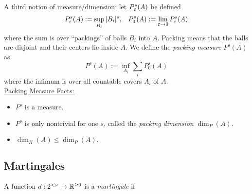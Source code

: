 \documentclass{amsart}
\begin{document}
	A third notion of measure/dimension: let $P^s_{\varepsilon}(A)$ be defined
	$$
	P^s_{\varepsilon}(A) := \sup_{B_i} |B_i|^s, \;\;\; P_0^s(A) := \lim_{\varepsilon\to 0} P_{\varepsilon}^s(A)
	$$
	where the sum is over ``packings'' of balls $B_i$ into $A$. Packing means that the balls are disjoint and their centers lie inside $A$. We define the \textit{packing measure} $P^s(A)$ as
	$$
	P^s(A) := \inf_{A_i} \sum_iP^s_0(A)
	$$
	where the infimum is over all countable covers $A_i$ of $A$.\\
	
	\underline{Packing Measure Facts:}
	\begin{itemize}
		\item $P^s$ is a measure.
		\item $P^s$ is only nontrivial for one $s$, called the \textit{packing dimension} $\dim_P(A)$.
		\item $\dim_H(A)\leq \dim_P(A)$.\\
	\end{itemize}
	
	\subsection{Martingales} A function $d:2^{<\omega}\to \mathbb{R}^{\geq 0}$ is a \textit{martingale} if 
	
\end{document}
